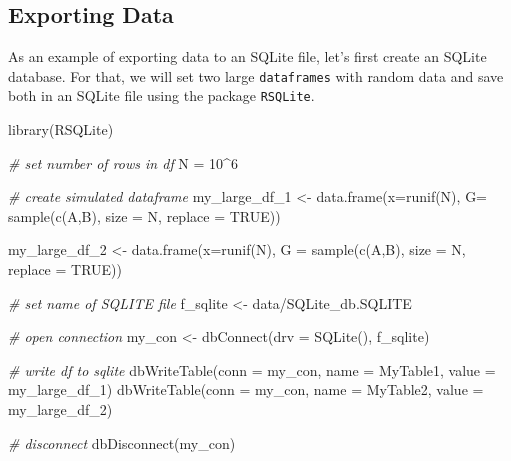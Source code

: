 \documentclass[
  12pt,
]{book}
\newenvironment{Shaded}{\begin{snugshade}}{\end{snugshade}}
\newcommand{\AttributeTok}[1]{\textcolor[rgb]{0.61,0.61,0.61}{#1}}
\newcommand{\CommentTok}[1]{\textcolor[rgb]{0.37,0.37,0.37}{\textit{#1}}}
\newcommand{\ConstantTok}[1]{\textcolor[rgb]{0,0,0}{#1}}
\newcommand{\DecValTok}[1]{\textcolor[rgb]{0.06,0.06,0.06}{#1}}
\newcommand{\FunctionTok}[1]{\textcolor[rgb]{0,0,0}{#1}}
\newcommand{\NormalTok}[1]{#1}
\newcommand{\OtherTok}[1]{\textcolor[rgb]{0.37,0.37,0.37}{#1}}
\newcommand{\SpecialCharTok}[1]{\textcolor[rgb]{0,0,0}{#1}}
\newcommand{\StringTok}[1]{\textcolor[rgb]{0.5,0.5,0.5}{#1}}
\begin{document}
\hypertarget{exporting-data-4}{%
\subsection{Exporting Data}\label{exporting-data-4}}

As an example of exporting data to an SQLite file, let's first create an SQLite database. For that, we will set two large \texttt{dataframes} with random data and save both in an SQLite file using the package \texttt{RSQLite}. 

\begin{Shaded}
\begin{Highlighting}[]
\FunctionTok{library}\NormalTok{(RSQLite)}

\CommentTok{\# set number of rows in df}
\NormalTok{N }\OtherTok{=} \DecValTok{10}\SpecialCharTok{\^{}}\DecValTok{6} 

\CommentTok{\# create simulated dataframe}
\NormalTok{my\_large\_df\_1 }\OtherTok{\textless{}{-}} \FunctionTok{data.frame}\NormalTok{(}\AttributeTok{x=}\FunctionTok{runif}\NormalTok{(N), }
                            \AttributeTok{G=} \FunctionTok{sample}\NormalTok{(}\FunctionTok{c}\NormalTok{(}\StringTok{\textquotesingle{}A\textquotesingle{}}\NormalTok{,}\StringTok{\textquotesingle{}B\textquotesingle{}}\NormalTok{),}
                                      \AttributeTok{size =}\NormalTok{ N,}
                                      \AttributeTok{replace =} \ConstantTok{TRUE}\NormalTok{))}

\NormalTok{my\_large\_df\_2 }\OtherTok{\textless{}{-}} \FunctionTok{data.frame}\NormalTok{(}\AttributeTok{x=}\FunctionTok{runif}\NormalTok{(N), }
                            \AttributeTok{G =} \FunctionTok{sample}\NormalTok{(}\FunctionTok{c}\NormalTok{(}\StringTok{\textquotesingle{}A\textquotesingle{}}\NormalTok{,}\StringTok{\textquotesingle{}B\textquotesingle{}}\NormalTok{),}
                                       \AttributeTok{size =}\NormalTok{ N,}
                                       \AttributeTok{replace =} \ConstantTok{TRUE}\NormalTok{))}

\CommentTok{\# set name of SQLITE file}
\NormalTok{f\_sqlite }\OtherTok{\textless{}{-}} \StringTok{\textquotesingle{}data/SQLite\_db.SQLITE\textquotesingle{}}

\CommentTok{\# open connection}
\NormalTok{my\_con }\OtherTok{\textless{}{-}} \FunctionTok{dbConnect}\NormalTok{(}\AttributeTok{drv =} \FunctionTok{SQLite}\NormalTok{(), f\_sqlite)}

\CommentTok{\# write df to sqlite}
\FunctionTok{dbWriteTable}\NormalTok{(}\AttributeTok{conn =}\NormalTok{ my\_con, }\AttributeTok{name =} \StringTok{\textquotesingle{}MyTable1\textquotesingle{}}\NormalTok{, }
             \AttributeTok{value =}\NormalTok{ my\_large\_df\_1)}
\FunctionTok{dbWriteTable}\NormalTok{(}\AttributeTok{conn =}\NormalTok{ my\_con, }\AttributeTok{name =} \StringTok{\textquotesingle{}MyTable2\textquotesingle{}}\NormalTok{, }
             \AttributeTok{value =}\NormalTok{ my\_large\_df\_2)}

\CommentTok{\# disconnect}
\FunctionTok{dbDisconnect}\NormalTok{(my\_con)}
\end{Highlighting}
\end{Shaded}
\end{document}
